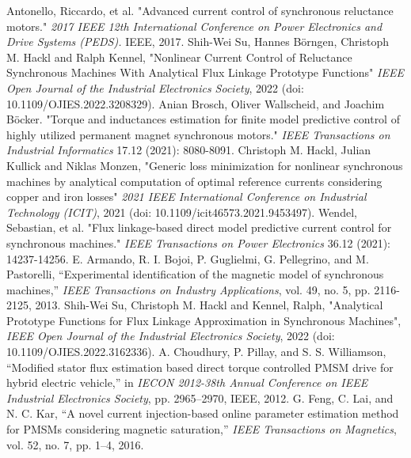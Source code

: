 \documentclass[conference]{IEEEtran}
\begin{document}
\begin{thebibliography}{00}
 Antonello, Riccardo, et al. "Advanced current control of synchronous reluctance motors." {\it{2017 IEEE 12th International Conference on Power Electronics and Drive Systems (PEDS).}} IEEE, 2017.
Shih-Wei Su, Hannes B{\"o}rngen, Christoph M. Hackl and Ralph Kennel, "Nonlinear Current Control of Reluctance Synchronous Machines With Analytical Flux Linkage Prototype Functions"
{\it {IEEE} Open Journal of the Industrial Electronics Society}, 2022 (doi: 10.1109/OJIES.2022.3208329).
 Anian Brosch, Oliver Wallscheid, and Joachim Böcker. "Torque and inductances estimation for finite model predictive control of highly utilized permanent magnet synchronous motors." {\it{IEEE Transactions on Industrial Informatics}} 17.12 (2021): 8080-8091. 
Christoph M. Hackl,  Julian Kullick and Niklas Monzen, "Generic loss minimization for nonlinear synchronous machines by analytical computation of optimal reference currents considering copper and iron losses"
{\it 2021 {IEEE} International Conference on Industrial Technology ({ICIT})}, 2021 (doi: 10.1109/icit46573.2021.9453497).
 Wendel, Sebastian, et al. "Flux linkage-based direct model predictive current control for synchronous machines." {\it{IEEE Transactions on Power Electronics}} 36.12 (2021): 14237-14256.
 E. Armando, R. I. Bojoi, P. Guglielmi, G. Pellegrino, and M. Pastorelli, “Experimental identification of the magnetic model of synchronous machines,” {\it{IEEE Transactions on Industry Applications}}, vol. 49, no. 5, pp. 2116-2125, 2013. 
Shih-Wei Su,  Christoph M. Hackl and Kennel, Ralph, "Analytical Prototype Functions for Flux Linkage Approximation in Synchronous Machines", {\it IEEE Open Journal of the Industrial Electronics Society}, 2022 (doi: 10.1109/OJIES.2022.3162336).
A. Choudhury, P. Pillay, and S. S. Williamson, “Modified stator flux estimation based direct torque controlled PMSM drive for hybrid electric vehicle,” in {\it{IECON 2012-38th Annual Conference on IEEE Industrial Electronics Society}}, pp. 2965–2970, IEEE, 2012. 
G. Feng, C. Lai, and N. C. Kar, “A novel current injection-based online parameter estimation method for PMSMs considering magnetic saturation,” {\it{IEEE Transactions on Magnetics}}, vol. 52, no. 7, pp. 1–4, 2016.

\end{thebibliography}
\end{document}
